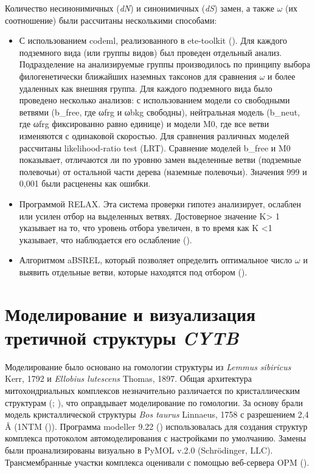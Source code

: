 Количество несинонимичных (\textit{dN}) и синонимичных (\textit{dS}) замен, а также $\omega$ (их соотношение) были рассчитаны несколькими способами: 
\begin{itemize}
	\item[\textbullet] С использованием codeml, реализованного в ete-toolkit (\cite{Huerta-Cepas2016}). Для каждого подземного вида (или группы видов) был проведен отдельный анализ. Подразделение на анализируемые группы производилось по принципу выбора филогенетически ближайших наземных таксонов для сравнения $\omega$ и более удаленных как внешняя группа. Для каждого подземного вида было проведено несколько анализов: с использованием модели со свободными ветвями (b\_free, где ωfrg и ωbkg свободны), нейтральная модель (b\_neut, где ωfrg фиксированно равно единице) и модели M0, где все ветви изменяются с одинаковой скоростью. Для сравнения различных моделей рассчитаны likelihood-ratio test (LRT). Сравнение моделей b\_free и M0 показывает, отличаются ли по уровню замен выделенные ветви (подземные полевочьи) от остальной части дерева (наземные полевочьи). Значения 999 и 0,001 были расценены как ошибки.
	\item[\textbullet] Программой RELAX. Эта система проверки гипотез анализирует, ослаблен или усилен отбор на выделенных ветвях. Достоверное значение K> 1 указывает на то, что уровень отбора увеличен, в то время как K <1 указывает, что наблюдается его ослабление (\cite{Wertheim2015}).
	\item[\textbullet] Алгоритмом aBSREL, который позволяет определить оптимальное число $\omega$ и выявить отдельные ветви, которые находятся под отбором (\cite{Smith2015}).     
\end{itemize}


\section{Моделирование и визуализация третичной структуры \textit{CYTB}}

Моделирование было основано на гомологии структуры из \textit{Lemmus sibiricus} Kerr, 1792 и \textit{Ellobius lutescens} Thomas, 1897. Общая архитектура митохондриальных комплексов незначительно различается по кристаллическим структурам (\cite{Crowley2008}; \cite{Hunte2000}), что оправдывает моделирование по гомологии. За основу брали модель кристаллической структуры  \textit{Bos taurus} Linnaeus, 1758 с разрешением 2,4 Å (1NTM (\cite{Gao2003})). Программа modeller 9.22 (\cite{Webb2016}) использовалась для создания структур комплекса протоколом автомоделирования с настройками по умолчанию. Замены были проанализированы визуально в PyMOL v.2.0 (Schrödinger, LLC). Трансмембранные участки комплекса оценивали с помощью веб-сервера OPM (\cite{Lomize2012}).

